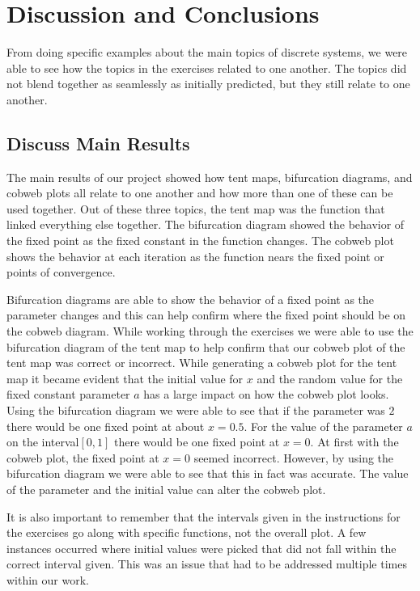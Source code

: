 \documentclass{article}
\begin{document}
 

\section{Discussion and Conclusions}
From doing specific examples about the main topics of discrete systems, we were able to see how the topics in the exercises related to one another. The topics did not blend together as seamlessly as initially predicted, but they still relate to one another.

\subsection{Discuss Main Results}
The main results of our project showed how tent maps, bifurcation diagrams, and cobweb plots all relate to one another and how more than one of these can be used together. Out of these three topics, the tent map was the function that linked everything else together. The bifurcation diagram showed the behavior of the fixed point as the fixed constant in the function changes. The cobweb plot shows the behavior at each iteration as the function nears the fixed point or points of convergence. 


Bifurcation diagrams are able to show the behavior of a fixed point as the parameter changes and this can help confirm where the fixed point should be on the cobweb diagram. While working through the exercises we were able to use the bifurcation diagram of the tent map to help confirm that our cobweb plot of the tent map was correct or incorrect. While generating a cobweb plot for the tent map it became evident that the initial value for $x$ and the random value for the fixed constant parameter $a$ has a large impact on how the cobweb plot looks. Using the bifurcation diagram we were able to see that if the parameter was $2$ there would be one fixed point at about $x=0.5$. For the value of the parameter $a$ on the interval$[0,1]$ there would be one fixed point at $x=0$. At first with the cobweb plot, the fixed point at $x=0$ seemed incorrect. However, by using the bifurcation diagram we were able to see that this in fact was accurate. The value of the parameter and the initial value can alter the cobweb plot.

It is also important to remember that the intervals given in the instructions for the exercises go along with specific functions, not the overall plot. A few instances occurred where initial values were picked that did not fall within the correct interval given. This was an issue that had to be addressed multiple times within our work.
\end{document}
